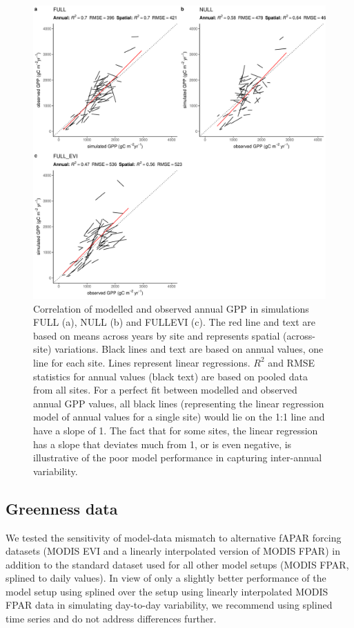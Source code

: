 \documentclass[gmd, manuscript]{copernicus}
\begin{document}
\begin{figure}[t]
    \includegraphics[width=12cm]{fig/modobs_spatial_annual.pdf}
    \caption{Correlation of modelled and observed annual GPP in simulations FULL (a), NULL (b) and FULL\textunderscore EVI (c). The red line and text are based on means across years by site and represents spatial (across-site) variations. Black lines and text are based on annual values, one line for each site. Lines represent linear regressions. $R^2$ and RMSE statistics for annual values (black text) are based on pooled data from all sites. For a perfect fit between modelled and observed annual GPP values, all black lines (representing the linear regression model of annual values for a single site) would lie on the 1:1 line and have a slope of 1. The fact that for some sites, the linear regression has a slope that deviates much from 1, or is even negative, is illustrative of the poor model performance in capturing inter-annual variability.}
    \label{fig:modobs_spatialannual}
\end{figure}


\subsection{Greenness data}
\label{sec:results_greenness}

We tested the sensitivity of model-data mismatch to alternative fAPAR forcing datasets (MODIS EVI and a linearly interpolated version of MODIS FPAR) in addition to the standard dataset used for all other model setups (MODIS FPAR, splined to daily values). In view of only a slightly better performance of the model setup using splined  over the setup using linearly interpolated MODIS FPAR data in simulating day-to-day variability, we recommend using splined time series and do not address differences further.
\end{document}
